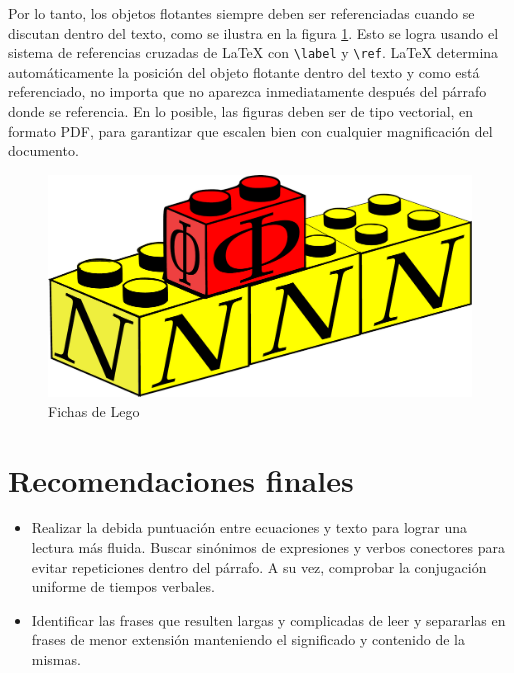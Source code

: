 \documentclass{article}
\begin{document}
Por lo tanto, los objetos flotantes siempre deben ser referenciadas cuando se discutan dentro del texto, como se ilustra en la figura \ref{fig:detector}. Esto se logra usando el sistema de referencias cruzadas de \LaTeX{} con \verb|\label| y \verb|\ref|. \LaTeX{} determina automáticamente la posición del objeto flotante dentro del texto y como está referenciado, no importa que no aparezca inmediatamente después del párrafo donde se referencia. En lo posible, las figuras deben ser de tipo vectorial, en formato PDF, para garantizar que escalen bien con cualquier magnificación del documento. 

\begin{figure}
    \centering
    \includegraphics[scale=0.2]{type1}
    \caption{Fichas de Lego}
    \label{fig:detector}
\end{figure}

\section{Recomendaciones finales}
\begin{itemize}
\item Realizar la debida puntuación entre ecuaciones y
texto para lograr una lectura más fluida. Buscar sinónimos de expresiones
y verbos conectores para evitar repeticiones dentro del párrafo. A su vez, comprobar
la conjugación uniforme de tiempos verbales.
\item Identificar las frases que resulten largas y complicadas de
leer y separarlas en frases de menor extensión manteniendo el significado
y contenido de la mismas.
\end{itemize}
\end{document}
